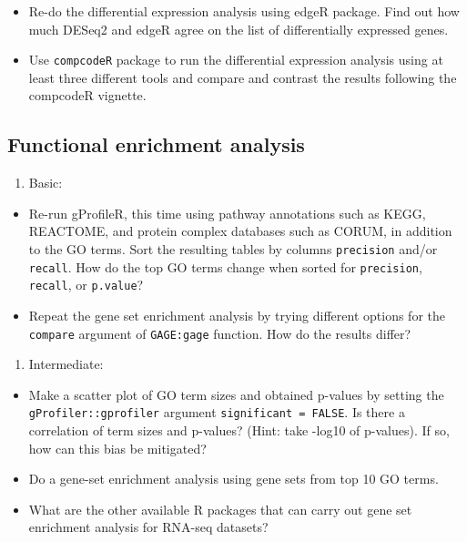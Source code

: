 \documentclass[12pt,]{krantz}
\providecommand{\tightlist}{%
  \setlength{\itemsep}{0pt}\setlength{\parskip}{0pt}}
\begin{document}
\begin{itemize}
\item
  Re-do the differential expression analysis using edgeR package. Find out how much DESeq2 and edgeR agree on the list of differentially expressed genes.
\item
  Use \texttt{compcodeR} package to run the differential expression analysis using at least three different tools and compare and contrast the results following the compcodeR vignette.
\end{itemize}

\hypertarget{functional-enrichment-analysis-1}{%
\subsection{Functional enrichment analysis}\label{functional-enrichment-analysis-1}}

\begin{enumerate}
\def\labelenumi{\arabic{enumi}.}
\tightlist
\item
  Basic:
\end{enumerate}

\begin{itemize}
\item
  Re-run gProfileR, this time using pathway annotations such as KEGG, REACTOME, and protein complex databases such as CORUM, in addition to the GO terms. Sort the resulting tables by columns \texttt{precision} and/or \texttt{recall}. How do the top GO terms change when sorted for \texttt{precision}, \texttt{recall}, or \texttt{p.value}?
\item
  Repeat the gene set enrichment analysis by trying different options for the \texttt{compare} argument of \texttt{GAGE:gage}
  function. How do the results differ?
\end{itemize}

\begin{enumerate}
\def\labelenumi{\arabic{enumi}.}
\setcounter{enumi}{1}
\tightlist
\item
  Intermediate:
\end{enumerate}

\begin{itemize}
\item
  Make a scatter plot of GO term sizes and obtained p-values by setting the \texttt{gProfiler::gprofiler} argument \texttt{significant\ =\ FALSE}. Is there a correlation of term sizes and p-values? (Hint: take -log10 of p-values). If so, how can this bias be mitigated?
\item
  Do a gene-set enrichment analysis using gene sets from top 10 GO terms.
\item
  What are the other available R packages that can carry out gene set enrichment analysis for RNA-seq datasets?
\end{itemize}
\end{document}
